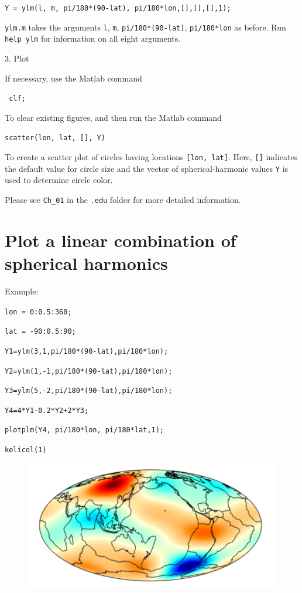 \documentclass{article}
\begin{document}
\verb+Y = ylm(l, m, pi/180*(90-lat), pi/180*lon,[],[],[],1);+


\verb+ylm.m+ takes the arguments \verb+l+, \verb+m+, \verb+pi/180*(90-lat)+, \verb+pi/180*lon+ as before. Run \verb+help ylm+ for information on all eight arguments. 

3. Plot

If necessary, use the Matlab command 

\verb+ clf;+

To clear existing figures, and then run the Matlab command

\verb+scatter(lon, lat, [], Y)+

To create a scatter plot of circles having locations \verb+[lon, lat]+. Here, \verb+[]+ indicates the default value for circle size and the vector of spherical-harmonic values \verb+Y+ is used to determine circle color. 

Please see \verb+Ch_01+ in the \verb+.edu+ folder for more detailed information.

\section{Plot a linear combination of spherical harmonics}

Example:
\vspace{2mm}

\setlength{\parskip}{.1mm}

\verb+lon = 0:0.5:360;+

\verb+lat = -90:0.5:90;+

\verb+Y1=ylm(3,1,pi/180*(90-lat),pi/180*lon);+

\verb+Y2=ylm(1,-1,pi/180*(90-lat),pi/180*lon);+

\verb+Y3=ylm(5,-2,pi/180*(90-lat),pi/180*lon);+

\verb!Y4=4*Y1-0.2*Y2+2*Y3;!

\verb+plotplm(Y4, pi/180*lon, pi/180*lat,1);+

\verb!kelicol(1)!
\begin{figure}[H]
\includegraphics[scale=1]{linear_combination}
\end{figure}
\end{document}
